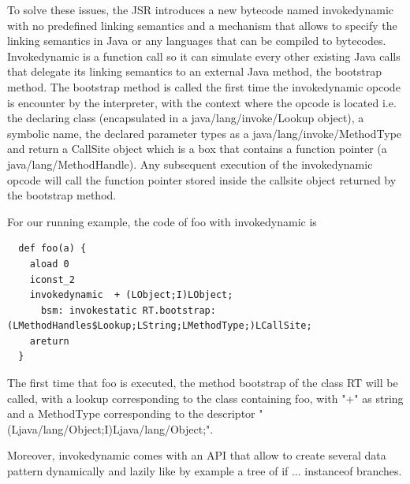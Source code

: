 \documentclass{sigplanconf}
\def \Jsr{JSR\xspace}
\begin{document}
      To solve these issues, the \Jsr introduces a new bytecode named invokedynamic with no predefined
      linking semantics and a mechanism that allows to specify the linking semantics in Java
      or any languages that can be compiled to bytecodes.
      Invokedynamic is a function call so it can simulate every other existing Java calls that delegate
      its linking semantics to an external Java method, the bootstrap method.
      The bootstrap method is called the first time the invokedynamic opcode is encounter by the interpreter,
      with the context where the opcode is located i.e.
      the declaring class (encapsulated in a java/lang/invoke/Lookup object), a symbolic name,
      the declared parameter types as a java/lang/invoke/MethodType and return
      a CallSite object which is a box that contains a function pointer (a java/lang/MethodHandle).
      Any subsequent execution of the invokedynamic opcode will call the function pointer
      stored inside the callsite object returned by the bootstrap method.
      
      For our running example, the code of foo with invokedynamic is
     {\tiny      
      \begin{verbatim}
  def foo(a) {
    aload 0
    iconst_2 
    invokedynamic  + (LObject;I)LObject;
      bsm: invokestatic RT.bootstrap:(LMethodHandles$Lookup;LString;LMethodType;)LCallSite;
    areturn 
  }
      \end{verbatim}
      }

      The first time that foo is executed, the method bootstrap of the class RT will be called, with a lookup corresponding to the class containing foo,
      with "+" as string and a MethodType corresponding to the descriptor "(Ljava/lang/Object;I)Ljava/lang/Object;".

      

      Moreover, invokedynamic comes with an API that allow to create several data pattern
      dynamically and lazily like by example a tree of if ... instanceof branches.

      \begin{figure}
        \centering {}
        \caption{}
      \end{figure}
\end{document}
